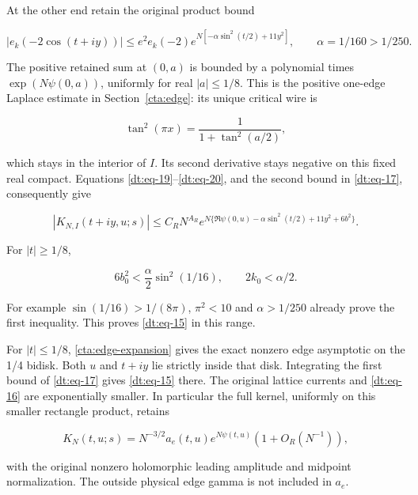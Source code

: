 At the other end retain the original product bound

\begin{equation}\label{dt:eq-20}
|e_k(-2\cos(t+iy))|
   \le e^2e_k(-2)e^{N[-\alpha\sin^2(t/2)+11y^2]},
                       \qquad \alpha=1/160>1/250.
\end{equation}

The positive retained sum at \((0,a)\) is bounded by a polynomial times
\(\exp(N\psi(0,a))\), uniformly for real \(|a|\le1/8\). This is the positive one-edge Laplace estimate in Section~\ref{cta:edge}: its unique critical wire is

\begin{equation}\label{dt:eq-21}
\tan^2(\pi x)=\frac1{1+\tan^2(a/2)},
\end{equation}

which stays in the interior of \(I\). Its second derivative stays negative
on this fixed real compact. Equations \eqref{dt:eq-19}--\eqref{dt:eq-20}, and the second bound
in \eqref{dt:eq-17}, consequently give

\begin{equation}\label{dt:eq-22}
|K_{N,I}(t+iy,u;s)|\le C_RN^{A_R}
 e^{N\{\Re\psi(0,u)-\alpha\sin^2(t/2)+11y^2+6b^2\}}.
\end{equation}

For \(|t|\ge1/8\),

\begin{equation}\label{dt:eq-23}
6b_0^2<\frac{\alpha}{2}\sin^2(1/16),\qquad
                         2k_0<\alpha/2.
\end{equation}

For example \(\sin(1/16)>1/(8\pi)\), \(\pi^2<10\) and \(\alpha>1/250\) already
prove the first inequality. This proves \eqref{dt:eq-15} in this range.

For \(|t|\le1/8\), \eqref{cta:edge-expansion} gives the exact
nonzero edge asymptotic on the 1/4 bidisk. Both \(u\) and \(t+iy\) lie strictly
inside that disk. Integrating the first bound of \eqref{dt:eq-17} gives \eqref{dt:eq-15} there.
The original lattice currents and \eqref{dt:eq-16} are exponentially smaller.
In particular the full kernel, uniformly on this smaller rectangle
product, retains

\begin{equation}\label{dt:eq-24}
K_N(t,u;s)=N^{-3/2}a_e(t,u)e^{N\psi(t,u)}
                         (1+O_R(N^{-1})),
\end{equation}

with the original nonzero holomorphic leading amplitude and midpoint
normalization. The outside physical edge gamma is not included in \(a_e\).
